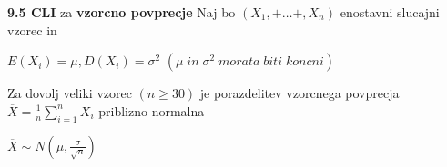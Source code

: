 \documentclass{article}
\begin{document}
\begin{multicols}{3}
\textbf{9.5 CLI} za \textbf{vzorcno povprecje}
Naj bo  $(X_1, + \dots +, X_n)$ enostavni slucajni vzorec in
\begin{center}
    \begin{math}
        E(X_i) = \mu, D(X_i) = \sigma^2
    \end{math}
    \begin{math}
        (\mu\; in\; \sigma^2\; morata\; biti\; koncni)
    \end{math}
\end{center}
Za dovolj veliki vzorec $(n \geq 30)$ je porazdelitev vzorcnega povprecja
$\overline{X} = \frac{1}{n} \sum_{i = 1}^{n} X_i$ priblizno normalna
\begin{center}
    \begin{math}
        \overline{X} \sim N(\mu, \frac{\sigma}{\sqrt{n}})
    \end{math}
\end{center}

\bigskip
\end{multicols}
\end{document}
